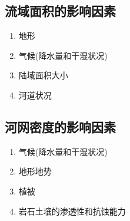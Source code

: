 \documentclass[a4paper]{article}
\begin{document}
    \subsection{流域面积的影响因素}
    \begin{enumerate}
        \item 地形
        \item 气候(降水量和干湿状况)
        \item 陆域面积大小
        \item 河道状况
    \end{enumerate}
    \subsection{河网密度的影响因素}
    \begin{enumerate}
        \item 气候(降水量和干湿状况)
        \item 地形地势
        \item 植被
        \item 岩石土壤的渗透性和抗蚀能力
    \end{enumerate}
\end{document}
